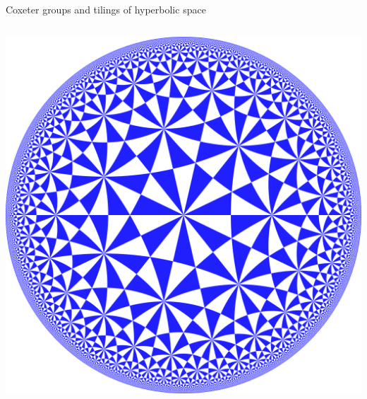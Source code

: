 \documentclass[8pt, handout]{beamer}
\begin{document}
\begin{frame}{Coxeter groups and tilings of hyperbolic space}
\begin{columns}
\begin{column}{.7\textwidth}
\begin{center}
        \includegraphics[width=.7\textwidth]{7-fold.png} %
      \end{center}
    \end{column}
  \end{columns}
  
\end{frame}

\end{document}
